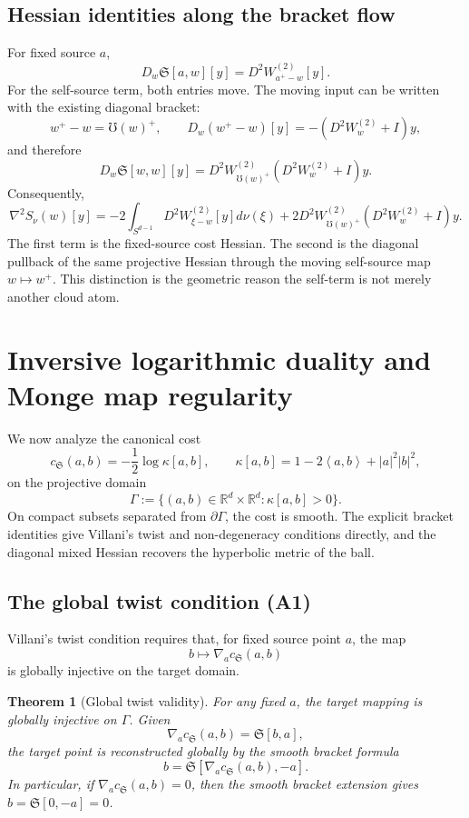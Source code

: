 \documentclass[11pt]{article}
\newtheorem{theorem}{Theorem}[section]
\newcommand{\R}{\mathbb{R}}
\newcommand{\Sph}{{S}}
\newcommand{\ip}[2]{\left\langle #1,#2\right\rangle}
\newcommand{\norm}[1]{\left|#1\right|}
\newcommand{\cs}{c_{\mathfrak S}}
\newcommand{\grad}{\nabla}
\newcommand{\UU}{\mho}
\newcommand{\Sbr}[2]{\mathfrak S[#1,#2]}
\newcommand{\kap}[2]{\kappa[#1,#2]}
\begin{document}
\subsection{Hessian identities along the bracket flow}

For fixed source $a$,
\[
    D_w\Sbr{a}{w}[y]=D^2W^{(2)}_{a^+-w}[y].
\]
For the self-source term, both entries move.  The moving input can be written with the existing diagonal bracket:
\[
    w^+-w=\UU(w)^+,
    \qquad
    D_w(w^+-w)[y]=-\left(D^2W^{(2)}_w+I\right)y,
\]
and therefore
\[
    \boxed{
    D_w\Sbr{w}{w}[y]
    =
    D^2W^{(2)}_{\UU(w)^+}\left(D^2W^{(2)}_w+I\right)y.
    }
\]
Consequently,
\[
    \boxed{
    \nabla^2S_\nu(w)[y]
    =-2\int_{\Sph^{d-1}}D^2W^{(2)}_{\xi-w}[y]d\nu(\xi)
    +2D^2W^{(2)}_{\UU(w)^+}\left(D^2W^{(2)}_w+I\right)y.
    }
\]
The first term is the fixed-source cost Hessian.  The second is the diagonal pullback of the same projective Hessian through the moving self-source map $w\mapsto w^+$.  This distinction is the geometric reason the self-term is not merely another cloud atom.

\section{Inversive logarithmic duality and Monge map regularity}

We now analyze the canonical cost
\[
    \cs(a,b)=-\frac12\log\kap{a}{b},
    \qquad
    \kap{a}{b}=1-2\ip a b+\norm a^2\norm b^2,
\]
on the projective domain
\[
    \Gamma:=\{(a,b)\in\R^d\times\R^d:\kap{a}{b}>0\}.
\]
On compact subsets separated from $\partial\Gamma$, the cost is smooth.  The explicit bracket identities give Villani's twist and non-degeneracy conditions directly, and the diagonal mixed Hessian recovers the hyperbolic metric of the ball.

\subsection{The global twist condition (A1)}

Villani's twist condition requires that, for fixed source point $a$, the map
\[
    b\longmapsto \grad_a\cs(a,b)
\]
is globally injective on the target domain.

\begin{theorem}[Global twist validity]
For any fixed $a$, the target mapping is globally injective on $\Gamma$.  Given
\[
    \grad_a\cs(a,b)=\Sbr{b}{a},
\]
the target point is reconstructed globally by the smooth bracket formula
\[
    \boxed{
    b=\Sbr{\grad_a\cs(a,b)}{-a}.
    }
\]
In particular, if $\grad_a\cs(a,b)=0$, then the smooth bracket extension gives $b=\Sbr{0}{-a}=0$.
\end{theorem}
\end{document}
